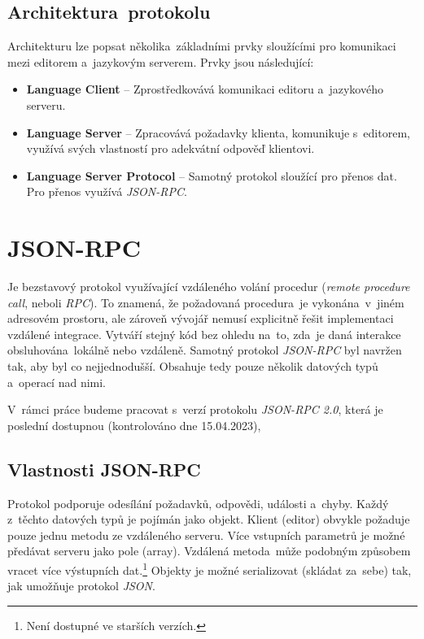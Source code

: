 \subsection{Architektura~protokolu}
\label{jsonrpcArchitektura}
Architekturu lze popsat několika~základními prvky sloužícími pro komunikaci mezi editorem a~jazykovým serverem. Prvky jsou následující:

\begin{itemize}
    \item{\textbf{Language Client} -- Zprostředkovává komunikaci editoru a~jazykového serveru.
    }
    \item{\textbf{Language Server} -- Zpracovává požadavky klienta, komunikuje s~editorem, využívá svých vlastností pro adekvátní odpověď klientovi.
    }
    \item{\textbf{Language Server Protocol} -- Samotný protokol sloužící pro přenos dat. Pro přenos využívá \textit{JSON-RPC}.
    }
\end{itemize}

\section{JSON-RPC}
\label{jsonrpc}
Je bezstavový protokol využívající vzdáleného volání procedur (\emph{remote procedure call}, neboli \emph{RPC}). To znamená, že požadovaná procedura~je vykonána~v~jiném adresovém prostoru, ale zároveň vývojář nemusí explicitně řešit implementaci vzdálené integrace. Vytváří stejný kód bez ohledu na~to, zda~je daná interakce obsluhována~lokálně nebo vzdáleně. Samotný protokol \emph{JSON-RPC} byl navržen tak, aby byl co nejjednodušší. Obsahuje tedy pouze několik datových typů a~operací nad nimi. 

V~rámci práce budeme pracovat s~verzí protokolu \emph{JSON-RPC 2.0}, která je poslední dostupnou (kontrolováno dne 15.04.2023),

\newpage
\subsection{Vlastnosti JSON-RPC}
\label{jsonrpcVlastnosti}
Protokol podporuje odesílání požadavků, odpovědi, události a~chyby. Každý z~těchto datových typů je pojímán jako objekt. Klient (editor) obvykle požaduje pouze jednu metodu ze vzdáleného serveru. Více vstupních parametrů je možné předávat serveru jako pole (array). Vzdálená metoda~může podobným způsobem vracet více výstupních dat.\footnote{Není dostupné ve starších verzích.} Objekty je možné serializovat (skládat za~sebe) tak, jak umožňuje protokol \emph{JSON}. 

